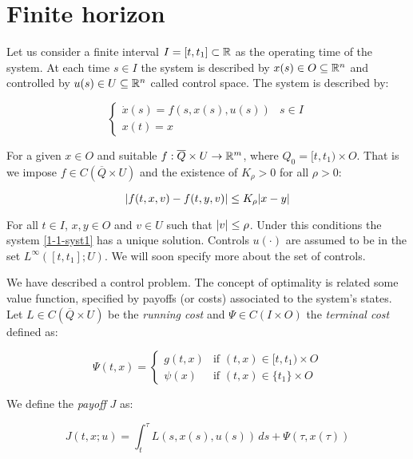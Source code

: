 \section{Finite horizon}


Let us consider a finite interval $I=[t,t_1]\subset\mathbb{R}$ as the operating time of the system. At each time $s\in I$ the system is described by $x(s)\in O\subseteq \mathbb{R}^n$ and controlled by $u(s)\in U\subseteq\mathbb{R}^n$
called control space. The system is described by:

\begin{equation}\label{1-1-syst1}
    \begin{cases}
        \dot{x}(s) = f(s,x(s),u(s)) & s\in I \\
        x(t) = x
    \end{cases}
\end{equation}

For a given $x\in O$ and suitable $f:\overline{Q}\times U \rightarrow \mathbb{R}^m$, where $Q_0=[t,t_1)\times O$. That is we impose $f\in C(\overline{Q}\times U)$ and the existence of $K_{\rho}>0$ for all $\rho>0$:

\begin{equation}\label{1-1-lipsch}
    \abs{f(t,x,v)-f(t,y,v)} \leq K_{\rho}\abs{x-y}
\end{equation}

For all $t\in I$, $x,y\in O$ and $v\in U$ such that $\abs{v}\leq\rho$. Under this conditions the system \ref*{1-1-syst1} has a unique solution. 
Controls $u(\cdot)$ are assumed to be in the set $L^{\infty}\left([t,t_1];U\right)$. We will soon specify more about the set of controls.

We have described a control problem. The concept of optimality is related some value function, specified by payoffs (or costs) associated to the system's states.
Let $L\in C(\overline{Q}\times U)$ be the \textit{running cost} and $\Psi\in C(I\times O)$ the \textit{terminal cost} defined as:

\begin{equation}\label{1-1-deftermcost}
    \Psi(t,x) = \begin{cases}
        g(t,x) & \text{if } (t,x)\in [t,t_1)\times O \\
        \psi(x) & \text{if } (t,x)\in \{t_1\}\times O  
    \end{cases}
\end{equation}

We define the \textit{payoff} $J$ as:

\begin{equation}\label{1-1-payoff1}
    J(t,x;u) = \int_t^{\tau}L(s,x(s),u(s)) \,ds + \Psi(\tau, x(\tau))
\end{equation}

